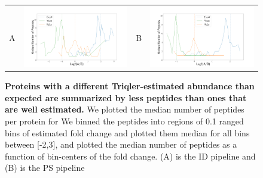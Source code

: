 \documentclass[11pt]{article}
\begin{document}
\begin{figure}[hbt]
    \centering
    \centering
    \begin{tabular}{lclc} 
        A & \includegraphics[width=0.5\linewidth]{../../result/report_plots_pipeline/fc_peptide_count_ID_triqler.png} &
        B & \includegraphics[width=0.5\linewidth]{../../result/report_plots_pipeline/fc_peptide_count_PS_triqler.png} \\
    \end{tabular}
    \caption{{\bf Proteins with a different Triqler-estimated abundance than expected are summarized by less peptides than ones that are well estimated.} We plotted the median number of peptides per protein for    
  We binned the peptides into regions of 0.1 ranged bins of estimated fold change and plotted them median for all bins between [-2,3], and plotted the median number of peptides as a function of bin-centers of the fold change. (A) is the ID pipeline and (B) is the PS pipeline \label{fig:number_of_peptides_supplement}}
\end{figure}
\end{document}
